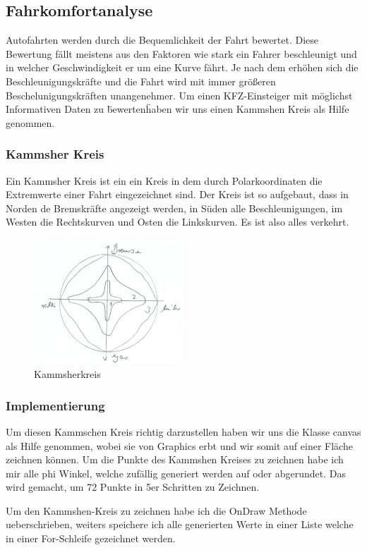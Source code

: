 \subsection{Fahrkomfortanalyse}


Autofahrten werden durch die Bequemlichkeit der Fahrt bewertet. 
Diese Bewertung fällt meistens aus den Faktoren wie stark ein Fahrer beschleunigt und in welcher Geschwindigkeit er um eine Kurve fährt. Je nach dem erhöhen sich die Beschleunigungskräfte und die Fahrt wird mit immer größeren Beschelunigungskräften unangenehmer.
Um einen KFZ-Einsteiger mit möglichst Informativen Daten zu \"bewerten\" haben wir uns einen Kammshen Kreis als Hilfe genommen.

\subsubsection{Kammsher Kreis }
Ein Kammsher Kreis ist ein ein Kreis in dem durch Polarkoordinaten die Extremwerte einer Fahrt eingezeichnet sind.
Der Kreis ist so aufgebaut, dass in Norden de Bremskräfte angezeigt werden, in Süden alle Beschleunigungen, im Westen die Rechtskurven und Osten die Linkskurven.
Es ist also alles verkehrt.
\begin{figure}[!htb]\centering
	\includegraphics[width=0.5\textwidth]{images/kammsherkreis}
	\caption{Kammsherkreis \cite{FAIF.CH3-fahrkomfortanalyse.KammscherKreis}}\label{Fig:Kammsher-Kreis}
\end{figure}

\subsubsection{Implementierung}
Um diesen Kammschen Kreis richtig darzustellen haben wir uns die Klasse canvas als Hilfe genommen, wobei sie von Graphics erbt und wir somit auf einer Fläche zeichnen können.
Um die Punkte des Kammshen Kreises zu zeichnen habe ich mir alle phi Winkel, welche zufällig generiert werden auf oder abgerundet. Das wird gemacht, um 72 Punkte in 5er Schritten zu Zeichnen.  





Um den Kammshen-Kreis zu zeichnen habe ich die OnDraw Methode ueberschrieben, weiters speichere ich alle generierten Werte in einer Liste welche in einer For-Schleife gezeichnet werden.